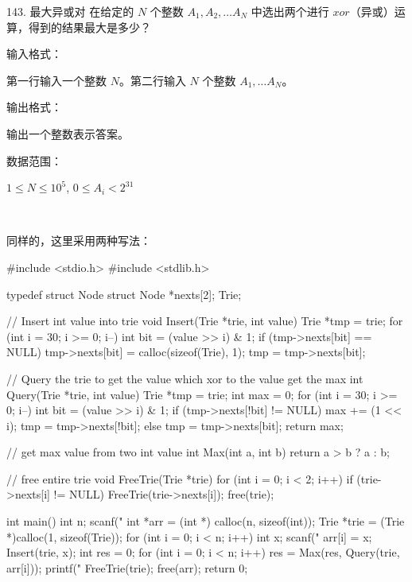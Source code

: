 \begin{titledbox}{143. 最大异或对}
    在给定的 $N$ 个整数 $A_1, A_2, \dots A_N$ 中选出两个进行 $xor$（异或）运算，得到的结果最大是多少？

    输入格式：

    第一行输入一个整数 $N$。第二行输入 $N$ 个整数 $A_1, \dots A_N$。

    输出格式：

    输出一个整数表示答案。

    数据范围：

    $1 \le N \le 10^5$, $0 \le A_i < 2^{31}$

    \begin{inputblock}
         \\
    \end{inputblock}
    \begin{outputblock}
    \end{outputblock}
\end{titledbox}

同样的，这里采用两种写法：

\begin{mycpptwocol}[链表形式的Trie]
    #include <stdio.h>
    #include <stdlib.h>

    typedef struct Node {
        struct Node *nexts[2];
    } Trie;

    // Insert int value into trie
    void Insert(Trie *trie, int value) {
        Trie *tmp = trie;
        for (int i = 30; i >= 0; i--) {
            int bit = (value >> i) & 1;
            if (tmp->nexts[bit] == NULL) {
                tmp->nexts[bit] = calloc(sizeof(Trie), 1);
            }
            tmp = tmp->nexts[bit];
        }
    }

    // Query the trie to get the value which xor to the value get the max
    int Query(Trie *trie, int value) {
        Trie *tmp = trie;
        int max = 0;
        for (int i = 30; i >= 0; i--) {
            int bit = (value >> i) & 1;
            if (tmp->nexts[!bit] != NULL) {
                max += (1 << i);
                tmp = tmp->nexts[!bit];
            } else {
                tmp = tmp->nexts[bit];
            }
        }
        return max;
    }

    // get max value from two int value
    int Max(int a, int b) {
        return a > b ? a : b;
    }

    // free entire trie
    void FreeTrie(Trie *trie) {
        for (int i = 0; i < 2; i++) {
            if (trie->nexts[i] != NULL) {
                FreeTrie(trie->nexts[i]);
            }
        }
        free(trie);
    }

    int main() {
        int n;
        scanf("%
        int *arr = (int *) calloc(n, sizeof(int));
        Trie *trie = (Trie *)calloc(1, sizeof(Trie));
        for (int i = 0; i < n; i++) {
            int x;
            scanf("%
            arr[i] = x;
            Insert(trie, x);
        }
        int res = 0;
        for (int i = 0; i < n; i++) {
            res = Max(res, Query(trie, arr[i]));
        }
        printf("%
        FreeTrie(trie);
        free(arr);
        return 0;
    }
\end{mycpptwocol}


